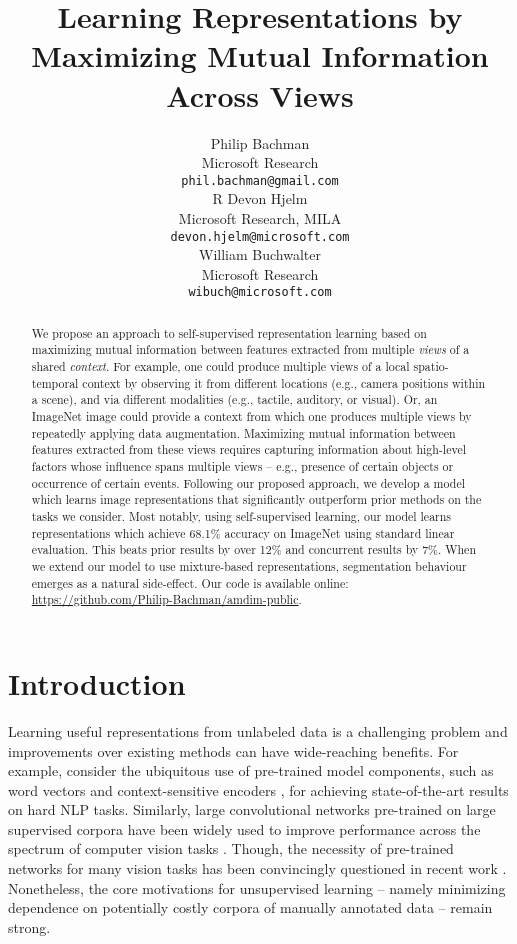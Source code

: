 \documentclass{article}
\title{Learning Representations by Maximizing Mutual Information Across Views}
\author{Philip Bachman \\
  Microsoft Research \\
  \texttt{phil.bachman@gmail.com} \\
\And
  R Devon Hjelm \\
  Microsoft Research, MILA \\
  \texttt{devon.hjelm@microsoft.com} \\
  \AND
  William Buchwalter \\
  Microsoft Research \\
  \texttt{wibuch@microsoft.com} \\
}
\begin{document}
\maketitle

\begin{abstract}
We propose an approach to self-supervised representation learning based on maximizing mutual information between features extracted from multiple \emph{views} of a shared \emph{context}.
For example, one could produce multiple views of a local spatio-temporal context by observing it from different locations (e.g., camera positions within a scene), and via different modalities (e.g., tactile, auditory, or visual).
Or, an ImageNet image could provide a context from which one produces multiple views by repeatedly applying data augmentation.
Maximizing mutual information between features extracted from these views requires capturing information about high-level factors whose influence spans multiple views -- e.g., presence of certain objects or occurrence of certain events.
Following our proposed approach, we develop a model which learns image representations that significantly outperform prior methods on the tasks we consider. Most notably, using self-supervised learning, our model learns representations which achieve 68.1\% accuracy on ImageNet using standard linear evaluation. This beats prior results by over 12\% and concurrent results by 7\%.
When we extend our model to use mixture-based representations, segmentation behaviour emerges as a natural side-effect.
Our code is available online: \url{https://github.com/Philip-Bachman/amdim-public}.
\end{abstract}

\section{Introduction}




Learning useful representations from unlabeled data is a challenging problem and improvements over existing methods can have wide-reaching benefits. For example, consider the ubiquitous use of pre-trained model components, such as word vectors \citep{Mikolov2013, Pennington2014} and context-sensitive encoders \citep{Peters2018, Devlin2019}, for achieving state-of-the-art results on hard NLP tasks. Similarly, large convolutional networks pre-trained on large supervised corpora have been widely used to improve performance across the spectrum of computer vision tasks \citep{Donahue2014, Ren2015, He2017, Carreira2017}. Though, the necessity of pre-trained networks for many vision tasks has been convincingly questioned in recent work \citep{He2018}. Nonetheless, the core motivations for unsupervised learning -- namely minimizing dependence on potentially costly corpora of manually annotated data -- remain strong. 
\end{document}
